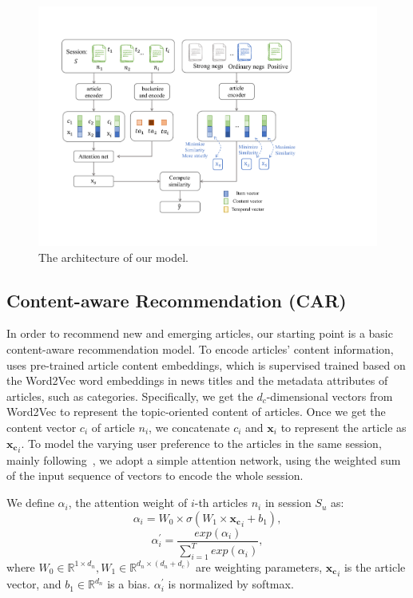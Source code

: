 \begin{figure}[th]
    \centering
    \includegraphics[width=\columnwidth]{fig/architecture.pdf}
    \caption{The architecture of our model.}
    \label{fig:arch}
\end{figure}

\subsection{Content-aware Recommendation (CAR)}
In order to recommend new and emerging articles,
our starting point is a basic content-aware recommendation model. 
To encode articles' content information, 
\citeauthor{moreira2019contextual} uses pre-trained article content embeddings, 
which is supervised trained based on the Word2Vec word embeddings in news titles and the metadata attributes of articles, such as categories.
Specifically, we get the $d_c$-dimensional vectors from Word2Vec to represent the 
topic-oriented content of articles. Once we get the content vector $c_i$ of 
article $n_i$, we concatenate $c_i$ and $\mathbf{x}_i$ to represent 
the article as $\mathbf{x_{c}}_i$. 
To model the varying user preference to the articles in the same session, mainly following~\citeauthor{liu2018stamp}, we adopt a simple attention network, using the weighted sum of the input sequence of vectors to encode the whole session.

We define $\alpha_i$, the attention weight of $i$-th articles $n_i$ in session $S_u$ as:
\begin{equation}
    \label{eq:alpha}
    \alpha_i = W_0 \times \sigma (W_1 \times \mathbf{x_{c}}_i +  b_1),
\end{equation}
\begin{equation}
    \alpha_i^{\prime} = \frac{exp(\alpha_i)}{\sum_{i=1}^T exp(\alpha_i)},
\end{equation}
where $W_0\in \mathbb{R}^{1 \times d_n}, W_1 \in \mathbb{R}^{d_n\times (d_n+d_c)}$ 
are weighting parameters, $\mathbf{x_{c}}_i$ is the article vector, 
and $b_1\in \mathbb{R}^{d_n}$ is a bias. $\alpha_i^{\prime}$ is normalized by softmax.

